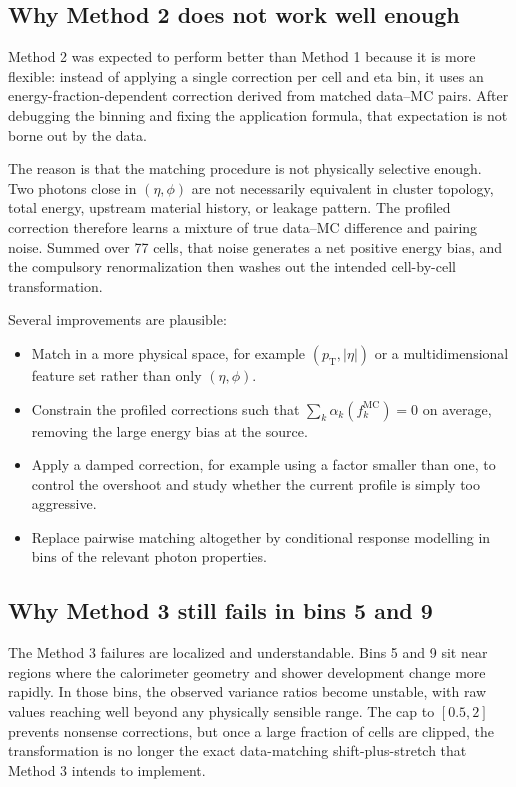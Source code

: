 \documentclass[11pt,a4paper]{article}
\newcommand{\abseta}{\ensuremath{|\eta|}}
\newcommand{\pt}{\ensuremath{p_{\mathrm{T}}}}
\begin{document}
\subsection{Why Method 2 does not work well enough}

Method 2 was expected to perform better than Method 1 because it is more
flexible: instead of applying a single correction per cell and eta bin, it uses
an energy-fraction-dependent correction derived from matched data--MC pairs.
After debugging the binning and fixing the application formula, that expectation
is not borne out by the data.

The reason is that the matching procedure is not physically selective enough.
Two photons close in $(\eta,\phi)$ are not necessarily equivalent in cluster
topology, total energy, upstream material history, or leakage pattern. The
profiled correction therefore learns a mixture of true data--MC difference and
pairing noise. Summed over 77 cells, that noise generates a net positive energy
bias, and the compulsory renormalization then washes out the intended
cell-by-cell transformation.

Several improvements are plausible:

\begin{itemize}
  \item Match in a more physical space, for example $(\pt, \abseta)$ or a
  multidimensional feature set rather than only $(\eta,\phi)$.
  \item Constrain the profiled corrections such that
  $\sum_k \alpha_k(f_k^{\mathrm{MC}}) = 0$ on average, removing the large energy
  bias at the source.
  \item Apply a damped correction, for example using a factor smaller than one,
  to control the overshoot and study whether the current profile is simply too
  aggressive.
  \item Replace pairwise matching altogether by conditional response modelling
  in bins of the relevant photon properties.
\end{itemize}

\subsection{Why Method 3 still fails in bins 5 and 9}

The Method 3 failures are localized and understandable. Bins 5 and 9 sit near
regions where the calorimeter geometry and shower development change more
rapidly. In those bins, the observed variance ratios become unstable, with raw
values reaching well beyond any physically sensible range. The cap to $[0.5,2]$
prevents nonsense corrections, but once a large fraction of cells are clipped,
the transformation is no longer the exact data-matching shift-plus-stretch that
Method 3 intends to implement.
\end{document}
